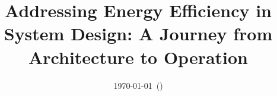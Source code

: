\documentclass[a4paper, 11pt, oneside]{Thesis}  %
\begin{document}
\frontmatter      %

\title  {Addressing Energy Efficiency in System Design: A Journey from Architecture to Operation}
\addresses  {\groupname\\\deptname\\\univname}  %
\date       {\today~(\currenttime)}
\subject    {}
\keywords   {}

\maketitle


\fancyhead{}  %
\rhead{\thepage}  %
\lhead{}  %

\pagestyle{fancy}  %
\end{document}
